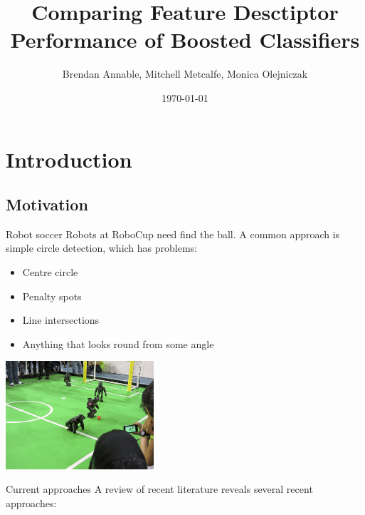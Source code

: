 \documentclass{beamer}
\title{Comparing Feature Desctiptor Performance of Boosted Classifiers }
\author{Brendan Annable, Mitchell Metcalfe, Monica Olejniczak}
\institute{The University of Newcastle, Australia}
\date{\today}
\begin{document}
	\maketitle



\section{Introduction}

	\subsection{Motivation}

	\begin{frame}{Robot soccer}
		Robots at RoboCup \citep{KitanoAKNO97} need find the ball. A common approach is simple circle detection, which has problems: \par
		\begin{itemize}
			\item Centre circle
	        \item Penalty spots
	        \item Line intersections
	        \item Anything that looks round from some angle
		\end{itemize}
		\begin{center}
			\includegraphics[height=4cm]{field2}
		\end{center}
	\end{frame}

	\begin{frame}{Current approaches}
		A review of recent literature reveals several recent approaches:
	\end{frame}
\end{document}
